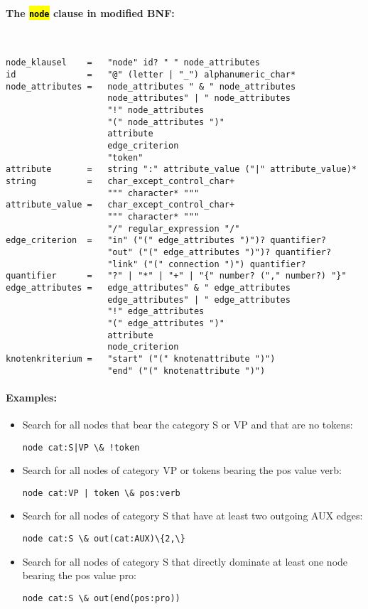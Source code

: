 \documentclass[12pt]{scrartcl}
\newcommand{\code}[1]{\hl{\texttt{#1}}}
\begin{document}
\paragraph*{The \code{node} clause in modified BNF:}
~
\begin{lstlisting}
node_klausel    =   "node" id? " " node_attributes
id              =   "@" (letter | "_") alphanumeric_char*
node_attributes =   node_attributes " & " node_attributes
                    node_attributes" | " node_attributes
                    "!" node_attributes
                    "(" node_attributes ")"
                    attribute
                    edge_criterion
                    "token"
attribute       =   string ":" attribute_value ("|" attribute_value)*
string          =   char_except_control_char+
                    """ character* """
attribute_value =   char_except_control_char+
                    """ character* """
                    "/" regular_expression "/"
edge_criterion  =   "in" ("(" edge_attributes ")")? quantifier?
                    "out" ("(" edge_attributes ")")? quantifier?
                    "link" ("(" connection ")") quantifier?
quantifier      =   "?" | "*" | "+" | "{" number? ("," number?) "}"
edge_attributes =   edge_attributes" & " edge_attributes
                    edge_attributes" | " edge_attributes
                    "!" edge_attributes
                    "(" edge_attributes ")"
                    attribute
                    node_criterion
knotenkriterium =   "start" ("(" knotenattribute ")")
                    "end" ("(" knotenattribute ")")
\end{lstlisting}


\paragraph*{Examples:}
\begin{itemize}
	\item Search for all nodes that bear the category S or VP and that are no tokens:
	\begin{lstlisting}[gobble=8,aboveskip=.6em,belowskip=.2em]
		node cat:S|VP \& !token
	\end{lstlisting}
	\item Search for all nodes of category VP or tokens bearing the pos value verb:
	\begin{lstlisting}[gobble=8,aboveskip=.6em,belowskip=.2em]
		node cat:VP | token \& pos:verb
	\end{lstlisting}
	\item Search for all nodes of category S that have at least two outgoing AUX edges:
	\begin{lstlisting}[gobble=8,aboveskip=.6em,belowskip=.2em]
		node cat:S \& out(cat:AUX)\{2,\}
	\end{lstlisting}
	\item Search for all nodes of category S that directly dominate at least one node bearing the pos value pro:
	\begin{lstlisting}[gobble=8,aboveskip=.6em,belowskip=.2em]
		node cat:S \& out(end(pos:pro))
	\end{lstlisting}
\end{itemize}
\end{document}
